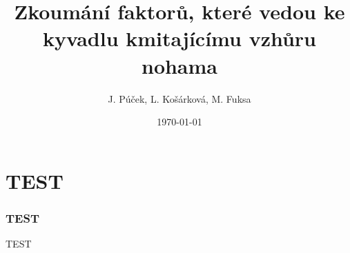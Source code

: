 \documentclass{beamer}
\title[Převrácené kyvadlo]{Zkoumání faktorů, které vedou ke kyvadlu kmitajícímu vzhůru nohama}
\author[J. P., L. K., M. F.]{J. Púček, L. Košárková, M. Fuksa}
\institute[Univerzita Karlova]{Univerzita Karlova, Česká republika}
\date{\today}
\begin{document}
\begin{frame}
\titlepage
\end{frame}

\section{TEST}
\label{sec:test}


\begin{frame}
  \frametitle{TEST}
  \begin{center}
    TEST
  \end{center}
\end{frame}
\end{document}
